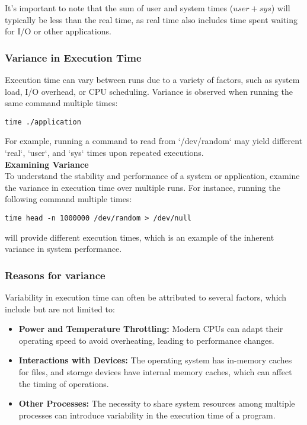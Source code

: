 \documentclass[12pt]{article}
\begin{document}
It's important to note that the sum of user and system times (\(user + sys\)) will typically be less than the real time, as real time also includes time spent waiting for I/O or other applications.

\subsubsection{Variance in Execution Time}
Execution time can vary between runs due to a variety of factors, such as system load, I/O overhead, or CPU scheduling. Variance is observed when running the same command multiple times:

\begin{lstlisting}
time ./application
\end{lstlisting}

For example, running a command to read from `/dev/random` may yield different `real`, `user`, and `sys` times upon repeated executions.\\

\textbf{Examining Variance}\\
To understand the stability and performance of a system or application, examine the variance in execution time over multiple runs. For instance, running the following command multiple times:

\begin{lstlisting}
time head -n 1000000 /dev/random > /dev/null
\end{lstlisting}

will provide different execution times, which is an example of the inherent variance in system performance.


\subsubsection{Reasons for variance}
Variability in execution time can often be attributed to several factors, which include but are not limited to:

\begin{itemize}
    \item \textbf{Power and Temperature Throttling:}
    Modern CPUs can adapt their operating speed to avoid overheating, leading to performance changes.
    
    \item \textbf{Interactions with Devices:}
    The operating system has in-memory caches for files, and storage devices have internal memory caches, which can affect the timing of operations.
    
    \item \textbf{Other Processes:}
    The necessity to share system resources among multiple processes can introduce variability in the execution time of a program.
\end{itemize}
\end{document}
